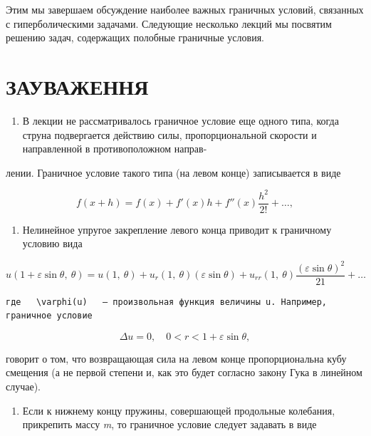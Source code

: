 \documentclass[
  ukrainian,
]{article}
\providecommand{\tightlist}{%
  \setlength{\itemsep}{0pt}\setlength{\parskip}{0pt}}
\begin{document}
Этим мы завершаем обсуждение наиболее важных граничных условий,
связанных с гиперболическими задачами. Следующие несколько лекций мы
посвятим решению задач, содержащих полобные граничные условия.

\section{ЗАУВАЖЕННЯ}\label{ux437ux430ux443ux432ux430ux436ux435ux43dux43dux44f-2}

\begin{enumerate}
\def\labelenumi{\arabic{enumi}.}
\tightlist
\item
  В лекции не рассматривалось граничное условие еще одного типа, когда
  струна подвергается действию силы, пропорциональной скорости и
  направленной в противоположном направ-
\end{enumerate}

лении. Граничное условие такого типа (на левом конце) записывается в
виде

\[
f(x+h) = f(x) + f'(x)h + f''(x)\frac{h^2}{2!} + \dots,
\]

\begin{enumerate}
\def\labelenumi{\arabic{enumi}.}
\setcounter{enumi}{1}
\tightlist
\item
  Нелинейное упругое закрепление левого конца приводит к граничному
  условию вида
\end{enumerate}

\[
u(1+\varepsilon\sin\theta,\ \theta)=u(1,\ \theta)+u_r(1,\ \theta)(\varepsilon\sin\theta)+u_{rr}(1,\ \theta)\frac{(\varepsilon\sin\theta)^2}{21}+\ldots
\]

\begin{verbatim}
где   \varphi(u)   — произвольная функция величины u. Например, граничное условие
\end{verbatim}

\[
\Delta u = 0, \quad 0 < r < 1 + \varepsilon \sin \theta,
\]

говорит о том, что возвращающая сила на левом конце пропорциональна кубу
смещения (а не первой степени и, как это будет согласно закону Гука в
линейном случае).

\begin{enumerate}
\def\labelenumi{\arabic{enumi}.}
\setcounter{enumi}{2}
\tightlist
\item
  Если к нижнему концу пружины, совершающей продольные колебания,
  прикрепить массу \emph{m}, то граничное условие следует задавать в
  виде
\end{enumerate}
\end{document}
